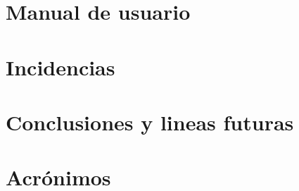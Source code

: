 \documentclass{memoriaPFC}
\begin{document}


\chapter{Manual de usuario}



\chapter{Incidencias}



\chapter{Conclusiones y lineas futuras}



\backmatter
\appendix


%

\chapter{Acrónimos}


\end{document}
